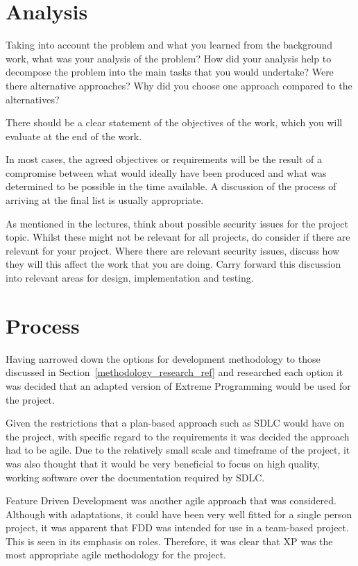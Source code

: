 \section{Analysis}
Taking into account the problem and what you learned from the background work, what was your analysis of the problem? How did your analysis help to decompose the problem into the main tasks that you would undertake? Were there alternative approaches? Why did you choose one approach compared to the alternatives? 

There should be a clear statement of the objectives of the work, which you will evaluate at the end of the work. 

In most cases, the agreed objectives or requirements will be the result of a compromise between what would ideally have been produced and what was determined to be possible in the time available. A discussion of the process of arriving at the final list is usually appropriate.

As mentioned in the lectures, think about possible security issues for the project topic. Whilst these might not be relevant for all projects, do consider if there are relevant for your project. Where there are relevant security issues, discuss how they will this affect the work that you are doing. Carry forward this discussion into relevant areas for design, implementation and testing.

\section{Process}
Having narrowed down the options for development methodology to those discussed in Section~\ref{methodology_research_ref} and researched each option it was decided that an adapted version of Extreme Programming would be used for the project. 

Given the restrictions that a plan-based approach such as SDLC  would have on the project, with specific regard to the requirements it was decided the approach had to be agile. Due to the relatively small scale and timeframe of the project, it was also thought that it would be very beneficial to focus on high quality, working software over the documentation required by SDLC.

Feature Driven Development was another agile approach that was considered. Although with adaptations, it could have been very well fitted for a single person project, it was apparent that FDD was intended for use in a team-based project. This is seen in its emphasis on roles. Therefore, it was clear that XP was the most appropriate agile methodology for the project.

